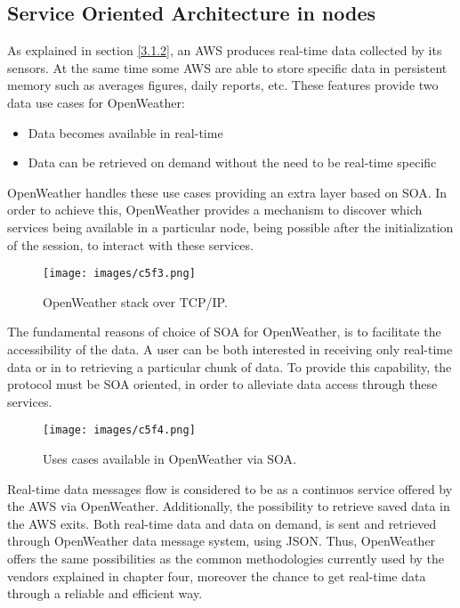 \subsection{Service Oriented Architecture in nodes}\label{5.2.2}

As explained in section \ref{3.1.2}, an \gls{AWS} produces real-time data collected by its sensors. At the same time some \gls{AWS} are able to store specific data in persistent memory such as averages figures, daily reports, etc. These features provide two data use cases for OpenWeather:

\begin{itemize}
\item Data becomes available in real-time
\item Data can be retrieved on demand without the need to be real-time specific
\end{itemize}

OpenWeather handles these use cases providing an extra layer based on \gls{SOA}. In order to achieve this, OpenWeather provides a mechanism to discover which services being available in a particular node, being possible after the initialization of the session, to interact with these services.

\begin{figure}[H]
\centerline{\texttt{[image: images/c5f3.png]}}
\caption{OpenWeather stack over TCP/IP.}
\end{figure}


The fundamental reasons of choice of \gls{SOA} for OpenWeather, is to facilitate the accessibility of the data. A user can be both interested in receiving only real-time data or in to retrieving a particular chunk of data. To provide this capability, the protocol must be \gls{SOA} oriented, in order to alleviate data access through these services.

\begin{figure}[H]
\centerline{\texttt{[image: images/c5f4.png]}}
\caption{Uses cases available in OpenWeather via \protect \gls{SOA}.}
\end{figure}

Real-time data messages flow is considered to be as a continuos service offered by the \gls{AWS} via OpenWeather. Additionally, the possibility to retrieve saved data in the \gls{AWS} exits. Both real-time data and data on demand, is sent and retrieved through OpenWeather data message system, using \gls{JSON}. Thus, OpenWeather offers the same possibilities as the common methodologies currently used by the vendors explained in chapter four, moreover the chance to get real-time data through a reliable and efficient way.

